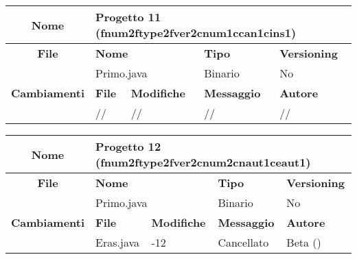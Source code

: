 
\begin{table}[ht]
\footnotesize
\begin{tabular}{|c|p{2.5cm}|p{2cm}|p{2.5cm}|p{2.5cm}|}
  \hline
  \textbf{Nome}	& \multicolumn{4}{l|}{Progetto 11 (fnum2ftype2fver2cnum1ccan1cins1)} 									\\
  \hline
  \rowcolor{lightgray}\textbf{File} 		& \multicolumn{2}{l|}{\textbf{Nome}}		& \textbf{Tipo}		& \textbf{Versioning} 		\\
						\cline{2-5}
						& \multicolumn{2}{l|}{Primo.java}		& Binario		& No				\\
  \hline
  \rowcolor{lightgray}\textbf{Cambiamenti}	& \textbf{File}		&\textbf{Modifiche}	& \textbf{Messaggio}	& \textbf{Autore}		\\
						\cline{2-5}
						& //			& //	  		& //			& //				\\
						
  \hline
\end{tabular}
\end{table}

\begin{table}[ht]
\footnotesize
\begin{tabular}{|c|p{2.5cm}|p{2cm}|p{2.5cm}|p{2.5cm}|}
  \hline
  \textbf{Nome}	& \multicolumn{4}{l|}{Progetto 12 (fnum2ftype2fver2cnum2cnaut1ceaut1)} 									\\
  \hline
  \rowcolor{lightgray}\textbf{File} 		& \multicolumn{2}{l|}{\textbf{Nome}}		& \textbf{Tipo}		& \textbf{Versioning} 		\\
						\cline{2-5}
						& \multicolumn{2}{l|}{Primo.java}		& Binario		& No				\\
  \hline
  \rowcolor{lightgray}\textbf{Cambiamenti}	& \textbf{File}		&\textbf{Modifiche}	& \textbf{Messaggio}	& \textbf{Autore}		\\
						\cline{2-5}
						& Eras.java		& -12	 		& Cancellato		& Beta ()			\\
						
  \hline
\end{tabular}
\end{table}

